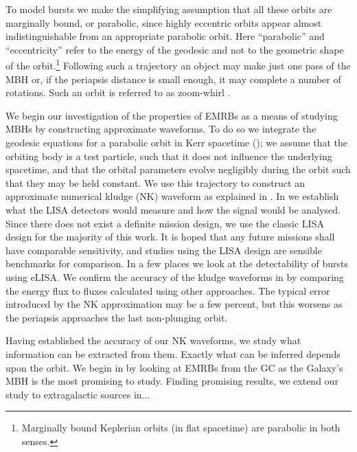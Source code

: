 To model bursts we make the simplifying assumption that all these orbits are marginally bound, or parabolic, since highly eccentric orbits appear almost indistinguishable from an appropriate parabolic orbit. Here ``parabolic'' and ``eccentricity'' refer to the energy of the geodesic and not to the geometric shape of the orbit.\footnote{Marginally bound Keplerian orbits (in flat spacetime) are parabolic in both senses.} Following such a trajectory an object may make just one pass of the MBH or, if the periapsis distance is small enough, it may complete a number of rotations. Such an orbit is referred to as zoom-whirl \citep{Glampedakis2002a}.

We begin our investigation of the properties of EMRBs as a means of studying MBHs by constructing approximate waveforms. To do so we integrate the geodesic equations for a parabolic orbit in Kerr spacetime (); we assume that the orbiting body is a test particle, such that it does not influence the underlying spacetime, and that the orbital parameters evolve negligibly during the orbit such that they may be held constant. We use this trajectory to construct an approximate numerical kludge (NK) waveform \citep{Babak2007} as explained in . In  we establish what the LISA detectors would measure and how the signal would be analysed. Since there does not exist a definite mission design, we use the classic LISA design for the majority of this work. It is hoped that any future missions shall have comparable sensitivity, and studies using the LISA design are sensible benchmarks for comparison. In a few places we look at the detectability of bursts using eLISA. We confirm the accuracy of the kludge waveforms in  by comparing the energy flux to fluxes calculated using other approaches. The typical error introduced by the NK approximation may be a few percent, but this worsens as the periapsis approaches the last non-plunging orbit.

Having established the accuracy of our NK waveforms, we study what information can be extracted from them. Exactly what can be inferred depends upon the orbit. We begin in  by looking at EMRBs from the GC as the Galaxy's MBH is the most promising to study. Finding promising results, we extend our study to extragalactic sources in...


